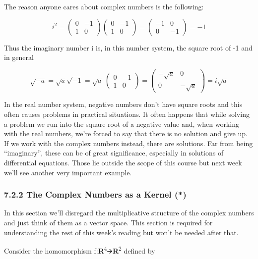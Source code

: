 \documentclass[oneside,english]{amsbook}
\numberwithin{section}{chapter}
\theoremstyle{plain}
\theoremstyle{definition}
\begin{document}
The reason anyone cares about complex numbers is the following:

\[i^{2} = \begin{pmatrix}
	0 & - 1 \\
	1 & 0
\end{pmatrix}\begin{pmatrix}
	0 & - 1 \\
	1 & 0
\end{pmatrix} = \begin{pmatrix}
	- 1 & 0 \\
	0 & - 1
\end{pmatrix} = - 1\]

Thus the imaginary number i is, in this number system, the square root
of -1 and in general

\[\sqrt{- a} = \sqrt{a}\sqrt{- 1} = \sqrt{a}\ \begin{pmatrix}
	0 & - 1 \\
	1 & 0
\end{pmatrix} = \begin{pmatrix}
	- \sqrt{a} & 0 \\
	0 & - \sqrt{a}
\end{pmatrix} = i\sqrt{a}\]

In the real number system, negative numbers don't have square roots and
this often causes problems in practical situations. It often happens
that while solving a problem we run into the square root of a negative
value and, when working with the real numbers, we're forced to say that
there is no solution and give up. If we work with the complex numbers
instead, there are solutions. Far from being ``imaginary'', these can be
of great significance, especially in solutions of differential
equations. Those lie outside the scope of this course but next week
we'll see another very important example.

\subsubsection{7.2.2 The Complex Numbers as a Kernel
	(*)}\label{the-complex-numbers-as-a-kernel}

In this section we'll disregard the multiplicative structure of the
complex numbers and just think of them as a vector space. This section
is required for understanding the rest of this week's reading but won't
be needed after that.

Consider the homomorphism
f:\textbf{R}\textsuperscript{4}🡪\textbf{R}\textsuperscript{2} defined by
\end{document}
